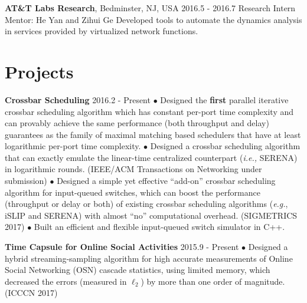 \documentclass[line,11pt,letter]{/home/saber/GitHub/personal-resume/includes/cls/myRes}
\begin{document}
\begin{resume}
\sspace
{\setlength{\parskip}{0pt}
{\bf AT\&T Labs Research}, Bedminster, NJ, USA \hfill 2016.5 - 2016.7\break
{\hspace*{1em} Research Intern \hfill Mentor: He Yan and Zihui Ge\break}
{\hspace*{1em} Developed tools to automate the dynamics analysis in services provided by virtualized network functions.\hfill\break}
}\negspace
\section{Projects}
\vspace{-4pt}
{\setlength{\parskip}{0pt}
{\bf Crossbar Scheduling} \hfill 2016.2 - Present\break
{\hspace*{1em} $\bullet$ Designed the {\bf first} parallel iterative crossbar scheduling algorithm which has constant per-port time complexity and can provably achieve the same performance (both throughput and delay) guarantees as the family of maximal matching based schedulers that have at least logarithmic per-port time complexity.\hfill\break}
{\hspace*{1em} $\bullet$ Designed a crossbar scheduling algorithm that can exactly emulate the linear-time centralized counterpart ({\it i.e.,} SERENA) in logarithmic rounds. (IEEE/ACM Transactions on Networking under submission)\hfill\break}
{\hspace*{1em} $\bullet$ Designed a simple yet effective ``add-on'' crossbar scheduling algorithm for input-queued switches, which can boost the performance (throughput or delay or both) of existing crossbar scheduling algorithms ({\it e.g.}, iSLIP and SERENA) with almost ``no'' computational overhead. (SIGMETRICS 2017)\hfill\break}
{\hspace*{1em} $\bullet$ Built an efficient and flexible input-queued switch simulator in C++.\hfill\break}
\sspace

}
{\setlength{\parskip}{0pt}
{\bf Time Capsule for Online Social Activities} \hfill 2015.9 - Present\break
{\hspace*{1em} $\bullet$ Designed a hybrid streaming-sampling algorithm for high accurate measurements of Online Social Networking (OSN) cascade statistics, using limited memory, which decreased the errors (measured in $\ell_2$) by more than one order of magnitude. (ICCCN 2017)\hfill\break}
\sspace

}
\end{resume}
\end{document}
